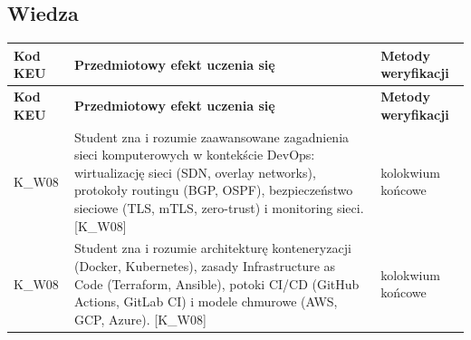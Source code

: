 \documentclass[12pt, a4paper]{article}
\newcommand{\thdrule}{\noalign{\global\setlength{\extrarowheight}{0pt}}}
\newcommand{\thdend}{\noalign{\global\setlength{\extrarowheight}{3pt}}}
\begin{document}
\subsection*{Wiedza}
{\scriptsize
\begin{longtable}{m{1.6cm}m{9.0cm}m{4.2cm}}
\thdrule\toprule
\rowcolor{pjatkRed} {\color{white}\footnotesize\textbf{\vphantom{Ag}Kod KEU}} & {\color{white}\footnotesize\textbf{\vphantom{Ag}Przedmiotowy efekt uczenia się}} & {\color{white}\footnotesize\textbf{\vphantom{Ag}Metody weryfikacji}} \\
\midrule\thdend
\endfirsthead
\thdrule\toprule
\rowcolor{pjatkRed} {\color{white}\footnotesize\textbf{\vphantom{Ag}Kod KEU}} & {\color{white}\footnotesize\textbf{\vphantom{Ag}Przedmiotowy efekt uczenia się}} & {\color{white}\footnotesize\textbf{\vphantom{Ag}Metody weryfikacji}} \\
\midrule\thdend
\endhead
  \rowcolor{tableRowLight} K\_W08 & Student zna i rozumie zaawansowane zagadnienia sieci komputerowych w kontekście DevOps: wirtualizację sieci (SDN, overlay networks), protokoły routingu (BGP, OSPF), bezpieczeństwo sieciowe (TLS, mTLS, zero-trust) i monitoring sieci. {[}K\_W08{]} & kolokwium końcowe \\
  \rowcolor{tableRowAlt} K\_W08 & Student zna i rozumie architekturę konteneryzacji (Docker, Kubernetes), zasady Infrastructure as Code (Terraform, Ansible), potoki CI/CD (GitHub Actions, GitLab CI) i modele chmurowe (AWS, GCP, Azure). {[}K\_W08{]} & kolokwium końcowe \\
\bottomrule
\end{longtable}}
\end{document}

